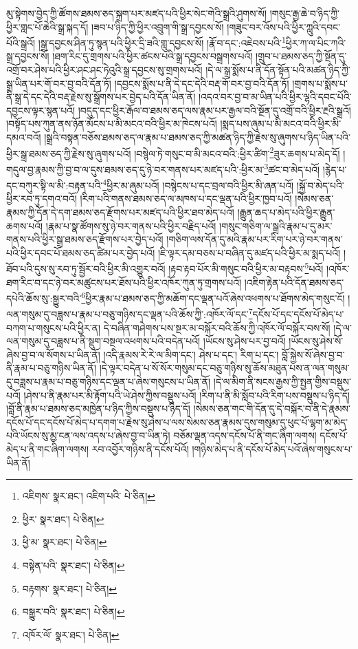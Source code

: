 མུ་སྟེགས་བྱེད་ཀྱི་ཚོགས་ཐམས་ཅད་སྐྲག་པར་མཛད་པའི་ཕྱིར་སེང་གེའི་སྒྲའི་ཤུགས་སོ། །གསུང་རྒྱ་ཆེ་བ་ཉིད་ཀྱི་ཕྱིར་གླང་པོ་ཆེའི་སྒྲ་སྐད་དོ། །ཟབ་པ་ཉིད་ཀྱི་ཕྱིར་འབྲུག་གི་སྒྲ་དབྱངས་སོ། །གཟུང་བར་འོས་པའི་ཕྱིར་ཀླུའི་དབང་པོའི་སྒྲའོ། །སྒྲ་དབྱངས་ཤིན་ཏུ་སྙན་པའི་ཕྱིར་དྲི་ཟའི་གླུ་དབྱངས་སོ། །རྣོ་བ་དང་:འཇེབས་པའི་\footnote{འཇིགས་  སྣར་ཐང་། འཇིག་པའི་  པེ་ཅིན། }ཕྱིར་ཀ་ལ་པིང་ཀའི་སྒྲ་དབྱངས་སོ། །ཐག་རིང་དུ་གྲགས་པའི་ཕྱིར་ཚངས་པའི་སྒྲ་དབྱངས་བསྒྲགས་པའོ། །གྲུབ་པ་ཐམས་ཅད་ཀྱི་སྔོན་དུ་འགྲོ་བར་ཤེས་པའི་ཕྱིར་ཤང་ཤང་ཏེའུའི་སྒྲ་དབྱངས་སུ་གྲགས་པའོ། །དེ་ལ་སྒྲ་སྨོས་པ་ནི་དོན་སྟོན་པའི་མཚན་ཉིད་ཀྱི་སྒྲ་ཡིན་པར་གོ་བར་བྱ་བའི་དོན་ཏོ། །དབྱངས་སྨོས་པ་ནི་དེ་དང་དེའི་བརྡ་གོ་བར་བྱ་བའི་དོན་ཏོ། །གྲགས་པ་སྨོས་པ་ནི་སྒྲ་དེ་དང་དེའི་བརྡ་རྗེས་སུ་སྒྲོགས་པར་བྱེད་པའི་དོན་ཡིན་ནོ། །འདའ་བར་བྱ་བ་མ་ཡིན་པའི་ཕྱིར་ལྷའི་དབང་པོའི་དབྱངས་ལྟར་སྙན་པའོ། །བདུད་དང་ཕྱིར་རྒོལ་བ་ཐམས་ཅད་ལས་རྣམ་པར་རྒྱལ་བའི་སྔོན་དུ་འགྲོ་བའི་ཕྱིར་རྔའི་སྒྲའོ། །བསྟོད་པས་ཀུན་ནས་ཉོན་མོངས་པ་མི་མངའ་བའི་ཕྱིར་མ་ཁེངས་པའོ། །སྨད་པས་ཞུམ་པ་མི་མངའ་བའི་ཕྱིར་མི་དམའ་བའོ། །སྒྲའི་བསྟན་བཅོས་ཐམས་ཅད་ལ་རྣམ་པ་ཐམས་ཅད་ཀྱི་མཚན་ཉིད་ཀྱི་རྗེས་སུ་ཞུགས་པ་ཉིད་ཡིན་པའི་ཕྱིར་སྒྲ་ཐམས་ཅད་ཀྱི་རྗེས་སུ་ཞུགས་པའོ། །བསྙེལ་ཏེ་གསུང་བ་མི་མངའ་བའི་:ཕྱིར་ཚིག་\footnote{ཕྱིར་  སྣར་ཐང་།  པེ་ཅིན། }ཟུར་ཆགས་པ་མེད་དོ། །གདུལ་བྱ་རྣམས་ཀྱི་བྱ་བ་ལ་དུས་ཐམས་ཅད་དུ་ཉེ་བར་གནས་པར་མཛད་པའི་:ཕྱིར་མ་\footnote{ཕྱི་མ་  སྣར་ཐང་།  པེ་ཅིན། }ཚང་བ་མེད་པའོ། །རྙེད་པ་དང་བཀུར་སྟི་ལ་མི་:བརྟན་པའི་\footnote{བསྟེན་པའི་  སྣར་ཐང་།  པེ་ཅིན། }ཕྱིར་མ་ཞུམ་པའོ། །བསྙེངས་པ་དང་བྲལ་བའི་ཕྱིར་མི་ཞན་པའོ། །སྐྱོ་བ་མེད་པའི་ཕྱིར་རབ་ཏུ་དགའ་བའོ། །རིག་པའི་གནས་ཐམས་ཅད་ལ་མཁས་པ་དང་ལྡན་པའི་ཕྱིར་ཁྱབ་པའོ། །སེམས་ཅན་རྣམས་ཀྱི་དོན་དེ་དག་ཐམས་ཅད་རྫོགས་པར་མཛད་པའི་ཕྱིར་ཐབ་མེད་པའོ། །རྒྱུན་ཆད་པ་མེད་པའི་ཕྱིར་རྒྱུན་ཆགས་པའོ། །རྣམ་པ་སྣ་ཚོགས་སུ་ཉེ་བར་གནས་པའི་ཕྱིར་བརྗིད་པའོ། །གསུང་གཅིག་ལ་སྒྲའི་རྣམ་པ་དུ་མར་གནས་པའི་ཕྱིར་སྒྲ་ཐམས་ཅད་རྫོགས་པར་བྱེད་པའོ། །གཅིག་ལས་དོན་དུ་མའི་རྣམ་པར་རིག་པར་ཉེ་བར་གནས་པའི་ཕྱིར་དབང་པོ་ཐམས་ཅད་ཚིམ་པར་བྱེད་པའོ། །ཇི་ལྟར་དམ་བཅས་པ་བཞིན་དུ་མཛད་པའི་ཕྱིར་མ་སྨད་པའོ། །ཐོབ་པའི་དུས་སུ་རབ་ཏུ་སྦྱོར་བའི་ཕྱིར་མི་འགྱུར་བའོ། །རྟབ་རྟབ་པོར་མི་གསུང་བའི་ཕྱིར་མ་བརྟབས་\footnote{བརྟགས་  སྣར་ཐང་།  པེ་ཅིན། }པའོ། །འཁོར་ཐག་རིང་བ་དང་ཉེ་བར་མཚུངས་པར་ཐོས་པའི་ཕྱིར་འཁོར་ཀུན་ཏུ་གྲགས་པའོ། །འཇིག་རྟེན་པའི་དོན་ཐམས་ཅད་དཔེའི་ཆོས་སུ་:སྒྱུར་བའི་\footnote{བསྒྱུར་བའི་  སྣར་ཐང་།  པེ་ཅིན། }ཕྱིར་རྣམ་པ་ཐམས་ཅད་ཀྱི་མཆོག་དང་ལྡན་པའོ་ཞེས་འཕགས་པ་ཐོགས་མེད་གསུང་ངོ། །ལན་གསུམ་དུ་བཟླས་པ་རྣམ་པ་བཅུ་གཉིས་དང་ལྡན་པའི་ཆོས་ཀྱི་:འཁོར་ལོ་དང་\footnote{འཁོར་ལོ་  སྣར་ཐང་།  པེ་ཅིན། }དངོས་པོ་དང་དངོས་པོ་མེད་པ་བཀག་པ་གསུངས་པའི་ཕྱིར་ན། དེ་བཞིན་གཤེགས་པས་སྔར་མ་བསྐོར་བའི་ཆོས་ཀྱི་འཁོར་ལོ་བསྐོར་བས་སོ། །དེ་ལ་ལན་གསུམ་དུ་བཟླས་པ་ནི་སྡུག་བསྔལ་འཕགས་པའི་བདེན་པའོ། །ཡོངས་སུ་ཤེས་པར་བྱ་བའོ། །ཡོངས་སུ་ཤེས་སོ་ཞེས་བྱ་བ་ལ་སོགས་པ་ཡིན་ནོ། །འདི་རྣམས་རེ་རེ་ལ་མིག་དང་། ཤེས་པ་དང་། རིག་པ་དང་། བློ་སྐྱེས་སོ་ཞེས་བྱ་བ་ནི་རྣམ་པ་བཅུ་གཉིས་ཡིན་ནོ། །དེ་ལྟར་བདེན་པ་སོ་སོར་གསུམ་དང་བཅུ་གཉིས་སུ་ཆོས་མཐུན་པས་ན་ལན་གསུམ་དུ་བཟླས་པ་རྣམ་པ་བཅུ་གཉིས་དང་ལྡན་པ་ཞེས་གསུངས་པ་ཡིན་ནོ། །དེ་ལ་མིག་ནི་སངས་རྒྱས་ཀྱི་སྤྱན་གྱིས་བསྡུས་པའོ། །ཤེས་པ་ནི་རྣམ་པར་མི་རྟོག་པའི་ཡེ་ཤེས་ཀྱིས་བསྡུས་པའོ། །རིག་པ་ནི་མི་སློབ་པའི་རིག་པས་བསྡུས་པ་ཉིད་དོ། །བློ་ནི་རྣམ་པ་ཐམས་ཅད་མཁྱེན་པ་ཉིད་ཀྱིས་བསྡུས་པ་ཉིད་དོ། །སེམས་ཅན་གང་གི་དོན་དུ་དེ་བསྐོར་བ་ནི་དེ་རྣམས་དངོས་པོ་དང་དངོས་པོ་མེད་པ་དགག་པ་རྗེས་སུ་ཤེས་པ་ལས་སེམས་ཅན་རྣམས་དུས་གསུམ་དུ་ཕུང་པོ་ལྷག་མ་མེད་པའི་ཡོངས་སུ་མྱ་ངན་ལས་འདས་པ་ཞེས་བྱ་བ་ཡིན་ཏེ། བཅོམ་ལྡན་འདས་དངོས་པོ་ནི་གང་ཞིག་ལགས། དངོས་པོ་མེད་པ་ནི་གང་ཞིག་ལགས། རབ་འབྱོར་གཉིས་ནི་དངོས་པོའོ། །གཉིས་མེད་པ་ནི་དངོས་པོ་མེད་པའོ་ཞེས་གསུངས་པ་ཡིན་ནོ། 